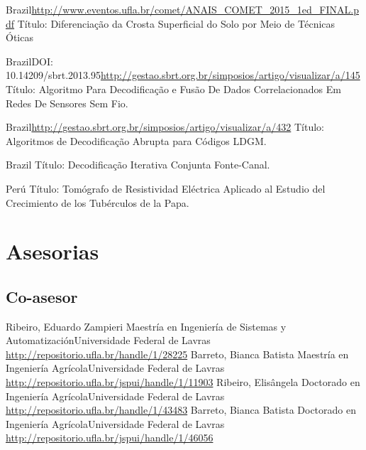 \documentclass[11pt,a4paper,sans]{moderncv} %
\begin{document}
	      {Brazil}{}{\url{http://www.eventos.ufla.br/comet/ANAIS\_COMET\_2015\_1ed\_FINAL.pdf}}
	      {Título: Diferenciação da Crosta Superficial do Solo por Meio de Técnicas Óticas}

	      {Brazil}{DOI: 10.14209/sbrt.2013.95}{\url{http://gestao.sbrt.org.br/simposios/artigo/visualizar/a/145}}
	      {Título: Algoritmo Para Decodificação e Fusão De Dados Correlacionados Em Redes De Sensores Sem Fio.}

	      {Brazil}{}{\url{http://gestao.sbrt.org.br/simposios/artigo/visualizar/a/432}}
	      {Título: Algoritmos de Decodificação Abrupta para Códigos LDGM.}

	      {Brazil}{}{}%
	      {Título: Decodificação Iterativa Conjunta Fonte-Canal.}

	      {Perú}{}{}
	      {Título: Tomógrafo de Resistividad Eléctrica Aplicado al Estudio del Crecimiento de los Tubérculos de la Papa.}


	       
\section{Asesorias}
\subsection{Co-asesor}
			{Ribeiro, Eduardo Zampieri}
			{Maestría en Ingeniería de Sistemas y Automatización}{Universidade Federal de Lavras}
			{\url{http://repositorio.ufla.br/handle/1/28225}}
			{Barreto, Bianca Batista}
			{Maestría en Ingeniería Agrícola}{Universidade Federal de Lavras}
			{\url{http://repositorio.ufla.br/jspui/handle/1/11903}}
			{Ribeiro, Elisângela }
			{Doctorado en Ingeniería Agrícola}{Universidade Federal de Lavras}
			{\url{http://repositorio.ufla.br/handle/1/43483}}
			{Barreto, Bianca Batista}
			{Doctorado en Ingeniería Agrícola}{Universidade Federal de Lavras}
			{\url{http://repositorio.ufla.br/jspui/handle/1/46056}}
			
\end{document}
